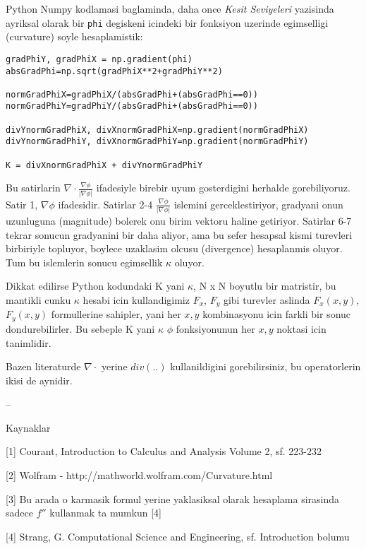 \documentclass[12pt,fleqn]{article}\usepackage{../common}
\begin{document}
Python Numpy kodlamasi baglaminda, daha once {\em Kesit Seviyeleri} yazisinda
ayriksal olarak bir \verb!phi! degiskeni icindeki bir fonksiyon uzerinde
egimselligi (curvature) soyle hesaplamistik:

\begin{verbatim}
gradPhiY, gradPhiX = np.gradient(phi)
absGradPhi=np.sqrt(gradPhiX**2+gradPhiY**2)                               

normGradPhiX=gradPhiX/(absGradPhi+(absGradPhi==0))
normGradPhiY=gradPhiY/(absGradPhi+(absGradPhi==0))

divYnormGradPhiX, divXnormGradPhiX=np.gradient(normGradPhiX)
divYnormGradPhiY, divXnormGradPhiY=np.gradient(normGradPhiY)
                       
K = divXnormGradPhiX + divYnormGradPhiY
\end{verbatim}

Bu satirlarin $\nabla \cdot \frac{\nabla \phi}{|\nabla \phi|}$ ifadesiyle
birebir uyum gosterdigini herhalde gorebiliyoruz. Satir 1, $\nabla \phi$
ifadesidir. Satirlar 2-4 $\frac{\nabla \phi}{|\nabla \phi|}$ islemini
gerceklestiriyor, gradyani onun uzunluguna (magnitude) bolerek onu birim vektoru
haline getiriyor. Satirlar 6-7 tekrar sonucun gradyanini bir daha aliyor, ama bu
sefer hesapsal kismi turevleri birbiriyle topluyor, boylece uzaklasim olcusu
(divergence) hesaplanmis oluyor. Tum bu islemlerin sonucu egimsellik $\kappa$
oluyor.

Dikkat edilirse Python kodundaki K yani $\kappa$, N x N boyutlu bir matristir,
bu mantikli cunku $\kappa$ hesabi icin kullandigimiz $F_x$, $F_y$ gibi
turevler aslinda $F_x(x,y)$, $F_y(x,y)$ formullerine sahipler, yani her $x,y$
kombinasyonu icin farkli bir sonuc dondurebilirler. Bu sebeple K yani $\kappa$
$\phi$ fonksiyonunun her $x,y$ noktasi icin tanimlidir. 

Bazen literaturde $\nabla \cdot$ yerine $div(..)$ kullanildigini gorebilirsiniz,
bu operatorlerin ikisi de aynidir.

--

Kaynaklar

[1] Courant, Introduction to Calculus and Analysis Volume 2, sf. 223-232

[2] Wolfram - http://mathworld.wolfram.com/Curvature.html

[3] Bu arada o karmasik formul yerine yaklasiksal olarak hesaplama
sirasinda sadece $f''$ kullanmak ta mumkun [4]

[4] Strang, G. Computational Science and Engineering, sf. Introduction bolumu
\end{document}
